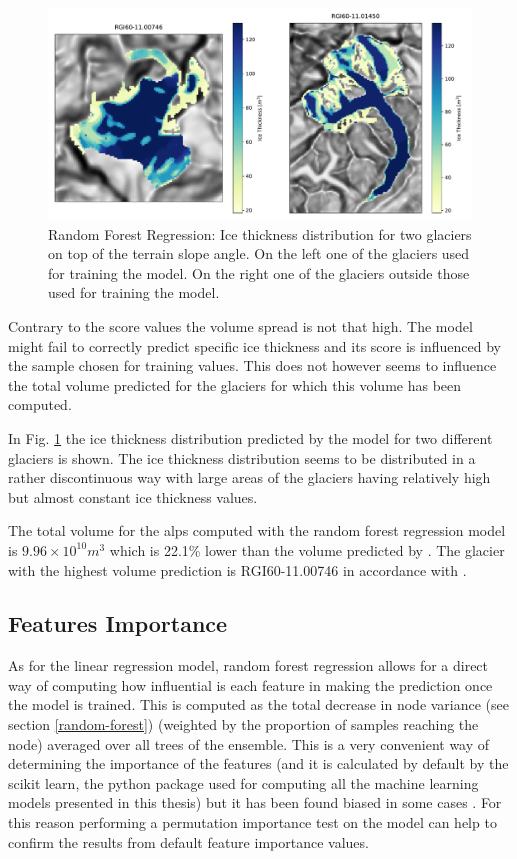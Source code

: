\begin{figure}[!tp]
	\centering		  
	\includegraphics[width=1.\textwidth]{figures/RFR_thick_map.pdf}
	\caption{Random Forest Regression: Ice thickness distribution for two glaciers on top of the terrain slope angle. On the left one of the glaciers used for training the model. On the right one of the glaciers outside those used for training the model.}
	\label{fig:rfr-map}
\end{figure}

Contrary to the score values the volume spread is not that high. The model might fail to correctly predict specific ice thickness and its score is influenced by the sample chosen for training values. This does not however seems to influence the total volume predicted for the glaciers for which this volume has been computed.

In Fig. \ref{fig:rfr-map} the ice thickness distribution predicted by the model for two different glaciers is shown. The ice thickness distribution seems to be distributed in a rather discontinuous way with large areas of the glaciers having relatively high but almost constant ice thickness values. 

The total volume for the alps computed with the random forest regression model is $9.96 \times 10^{10}m^3$ which is 22.1\% lower than the volume predicted by \citet{Farinotti2019}. The glacier with the highest volume prediction is RGI60-11.00746 in accordance with \citet{Farinotti2019}.

\subsection{Features Importance}\label{rfr-features}

As for the linear regression model, random forest regression allows for a direct way of computing how influential is each feature in making the prediction once the model is trained. This is computed as the total decrease in node variance (see section \ref{random-forest}) (weighted by the proportion of samples reaching the node) averaged over all trees of the ensemble. This is a very convenient way of determining the importance of the features (and it is calculated by default by the scikit learn, the python package used for computing all the machine learning models presented in this thesis) but it has been found biased in some cases \cite{RandomFBias2007}. For this reason performing a permutation importance test on the model can help to confirm the results from default feature importance values. 

